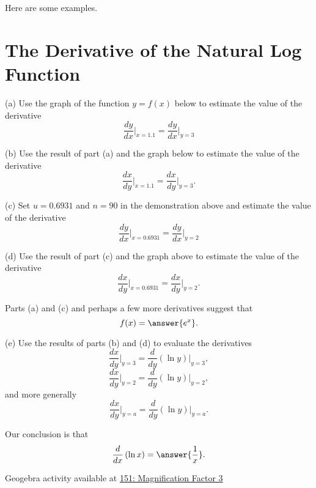 \documentclass{ximera}
\begin{document}
Here are some examples.




\section*{The Derivative of the Natural Log Function}

\begin{example}   \label{Ex:LDfjbbrt}

(a) Use the graph of the function $y=f(x)$ below to estimate the value of the derivative
\[
    \frac{dy}{dx}\Big|_{x=1.1} =  \frac{dy}{dx}\Big|_{y=3}
\]

(b) Use the result of part (a) and the graph below to estimate the value of the derivative 
\[
      \frac{dx}{dy}\Big|_{x=1.1} = \frac{dx}{dy}\Big|_{y=3} .
\]

\begin{onlineOnly}
    \begin{center}
\end{center}
\end{onlineOnly}

(c) Set $u=0.6931$ and $n=90$ in the demonstration above and estimate the value of the derivative
\[
    \frac{dy}{dx}\Big|_{x=0.6931} = \frac{dy}{dx}\Big|_{y=2}
\]

(d) Use the result of part (c) and the graph above to estimate the value of the derivative 
\[
      \frac{dx}{dy}\Big|_{x=0.6931} = \frac{dx}{dy}\Big|_{y=2} .
\]

\begin{question}  \label{Q:dfrr4f}
Parts (a) and (c) and perhaps a few more derivatives suggest that
\[
     f(x) = \answer{e^x} .
\]
\end{question}

(e) Use the results of parts (b) and (d) to evaluate the derivatives
\[
         \frac{dx}{dy}\Big|_{y=3} = \frac{d}{dy}\left(  \ln y  \right)\Big|_{y=3} ,
\]
\[
         \frac{dx}{dy}\Big|_{y=2} = \frac{d}{dy}\left(  \ln y  \right)\Big|_{y=2}  ,
\]
and more generally
\[
             \frac{dx}{dy}\Big|_{y=a} = \frac{d}{dy}\left(  \ln y  \right)\Big|_{y=a} . 
\]


\begin{question}  \label{Q:Dfdsfgt4gg}
Our conclusion is that
\[
   \frac{d}{dx} \left(  \ln x \right) = \answer{\frac{1}{x}} . 
\]
\end{question}

Geogebra activity available at \href{https://www.desmos.com/calculator/nnshzdh6jp}{151: Magnification Factor 3}

\end{example}
\end{document}
